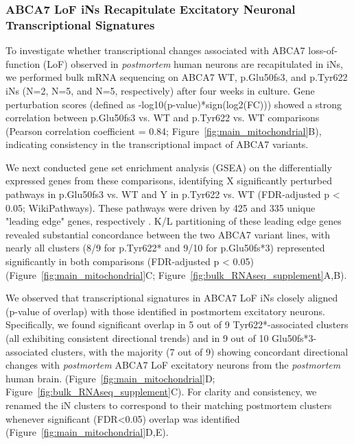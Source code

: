 \subsubsection{ABCA7 LoF iNs Recapitulate Excitatory Neuronal Transcriptional Signatures}
To investigate whether transcriptional changes associated with ABCA7 loss-of-function (LoF) observed in \emph{postmortem} human neurons are recapitulated in iNs, we performed bulk mRNA sequencing on ABCA7 WT, p.Glu50fs3, and p.Tyr622 iNs (N=2, N=5, and N=5, respectively) after four weeks in culture. Gene perturbation scores (defined as -log10(p-value)*sign(log2(FC))) showed a strong correlation between p.Glu50fs3 vs. WT and p.Tyr622 vs. WT comparisons (Pearson correlation coefficient = 0.84; Figure~\ref{fig:main_mitochondrial}B), indicating consistency in the transcriptional impact of ABCA7 variants.

We next conducted gene set enrichment analysis (GSEA) on the differentially expressed genes from these comparisons, identifying X significantly perturbed pathways in p.Glu50fs3 vs. WT and Y in p.Tyr622 vs. WT (FDR-adjusted p < 0.05; WikiPathways). These pathways were driven by 425 and 335 unique "leading edge" genes, respectively \cite{Subramanian2005-pu}. K/L partitioning of these leading edge genes revealed substantial concordance between the two ABCA7 variant lines, with nearly all clusters (8/9 for p.Tyr622* and 9/10 for p.Glu50fs*3) represented significantly in both comparisons (FDR-adjusted p < 0.05) (Figure~\ref{fig:main_mitochondrial}C; Figure~\ref{fig:bulk_RNAseq_supplement}A,B).

We observed that transcriptional signatures in ABCA7 LoF iNs closely aligned (p-value of overlap) with those identified in postmortem excitatory neurons. Specifically, we found significant overlap in 5 out of 9 Tyr622*-associated clusters (all exhibiting consistent directional trends) and in 9 out of 10 Glu50fs*3-associated clusters, with the majority (7 out of 9) showing concordant directional changes with \emph{postmortem} ABCA7 LoF excitatory neurons from the \emph{postmortem} human brain. (Figure~\ref{fig:main_mitochondrial}D; Figure~\ref{fig:bulk_RNAseq_supplement}C). For clarity and consistency, we renamed the iN clusters to correspond to their matching postmortem clusters whenever significant (FDR<0.05) overlap was identified (Figure~\ref{fig:main_mitochondrial}D,E).

